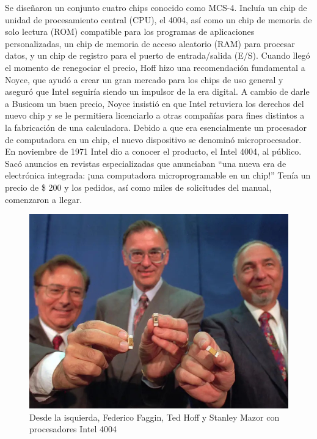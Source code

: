 Se diseñaron un conjunto cuatro chips conocido como MCS-4. Incluía un chip de unidad de procesamiento central (CPU), el 4004, así como un chip de memoria 
de solo lectura (ROM) compatible para los programas de aplicaciones personalizadas, un chip de memoria de acceso aleatorio (RAM) para procesar datos, y un 
chip de registro para el puerto de entrada/salida (E/S). Cuando llegó el momento de renegociar el precio, Hoff hizo una recomendación fundamental a Noyce, 
que ayudó a crear un gran mercado para los chips de uso general y aseguró que Intel seguiría siendo un impulsor de la era digital.
A cambio de darle a Busicom un buen precio, Noyce insistió en que Intel retuviera los derechos del nuevo chip y se le permitiera licenciarlo a otras 
compañías para fines distintos a la fabricación de una calculadora. Debido a que era esencialmente un procesador de computadora en un chip, el nuevo dispositivo 
se denominó microprocesador. En noviembre de 1971 Intel dio a conocer el producto, el Intel 4004, al público. Sacó anuncios en revistas especializadas 
que anunciaban “una nueva era de electrónica integrada: ¡una computadora microprogramable en un chip!” Tenía un precio de \$ 200 y los pedidos, 
así como miles de solicitudes del manual, comenzaron a llegar.

\begin{figure}[htb]
	\centering
	\includegraphics[scale = 0.25]{Graphics/faggin_hoff_mazor_-4004.jpg}
	\caption{Desde la isquierda, Federico Faggin, Ted Hoff y Stanley Mazor con procesadores Intel 4004}
	\label{fig:10}
\end{figure}

